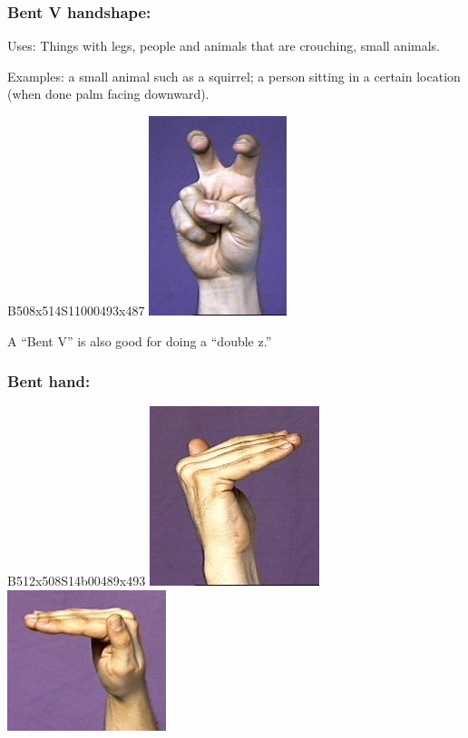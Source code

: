 \documentclass{article}
\begin{document}
\subsubsection{Bent V handshape:}

Uses:
Things with legs, people and animals that are crouching, small animals.

Examples:
a small animal such as a squirrel;
a person sitting in a certain location (when done palm facing downward).

B508x514S11000493x487
\includegraphics[scale=0.5]{images/v-bent.jpg}

A ``Bent V'' is also good for doing a ``double z.''

\subsubsection{Bent hand:}

B512x508S14b00489x493
\includegraphics[scale=0.5]{images/benthandshape.jpg}
\includegraphics[scale=0.5]{images/benthandshape2.jpg}
\end{document}
